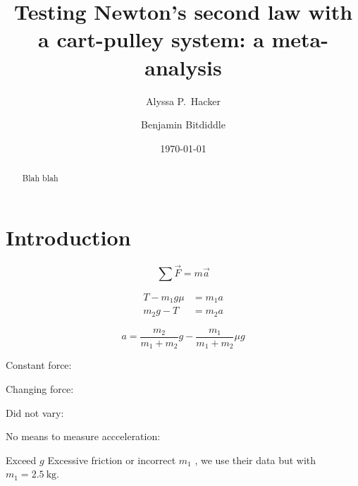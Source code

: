 \documentclass[reprint,amsmath,amssymb,aps,twoside]{revtex4-2}
\begin{document}
\setcounter{page}{1}
\title{Testing Newton's second law with a cart-pulley system: a meta-analysis}

\author{Alyssa P.~Hacker}
\author{Benjamin Bitdiddle}
\date{\today}

\begin{abstract}
Blah blah
\end{abstract}


\maketitle\thispagestyle{mytitlepage}





\section{Introduction}
\begin{equation}
\sum\vec{F} = m\vec{a}
\label{eq:n2l}
\end{equation}

\begin{align}
T - m_1 g \mu &= m_1 a \\
m_2 g - T &= m_2 a 
\end{align}

\cite{tipler,barrons}
\begin{equation}
a = \dfrac{m_2}{m_1+m_2} g - \dfrac{m_1}{m_1+m_2} \mu g
\end{equation}

Constant force: \cite{arenas-2024-testing,avalur-2024-verifying,canada-2024-experimental,kishore-2024-relationship,yagnyeshwaran-2024-verifying}

Changing force: \cite{govardhanen-2024-newtons,kedharnath-2024-examining,krasnopolsky-2024-testing}

Did not vary: \cite{perle-2024-experimental}

No means to measure accceleration: \cite{barone-2024-investigating}

Exceed $g$ \cite{krasnopolsky-2024-testing}
Excessive friction or incorrect $m_1$ \cite{govardhanen-2024-newtons}, we use their data but with $m_1=\qty{2.5}{\kilo\gram}$.
\end{document}
